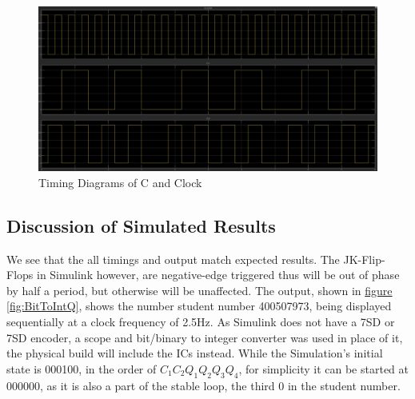 \documentclass{article}
\begin{document}
\begin{figure}[!htb]
    \includegraphics[width=\textwidth]{CandClockTimings.PNG}
    \caption{Timing Diagrams of C and Clock}
\end{figure}
\subsection{Discussion of Simulated Results}
We see that the all timings and output match expected results. The JK-Flip-Flops in Simulink however, are negative-edge triggered
thus will be out of phase by half a period, but otherwise will be unaffected. The output, shown in \hyperref[fig:BitToIntQ]{figure \ref{fig:BitToIntQ}}, shows the number student number 
400507973, being displayed sequentially at a clock frequency of 2.5Hz. As Simulink does not have a 7SD or 7SD encoder, a scope and bit/binary to integer converter was used 
in place of it, the physical build will include the ICs instead. While the Simulation's initial state is 000100, in the order of $C_1C_2Q_1Q_2Q_3Q_4$, for simplicity 
it can be started at 000000, as it is also a part of the stable loop, the third 0 in the student number.
\end{document}
